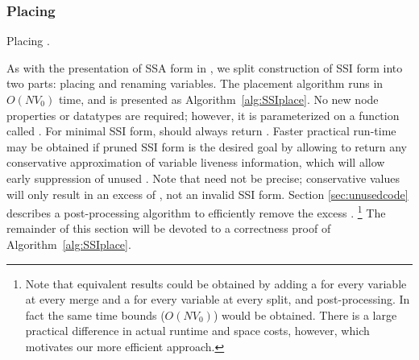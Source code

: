 \documentclass[12pt,titlepage,twoside]{article}
\begin{document}
\subsubsection{Placing }\label{sec:SSIplace}
\begin{myalgorithm}\small

\caption{Placing .}\label{alg:SSIplace}
\end{myalgorithm}

As with the presentation of SSA form in \cite{cytron91:ssa}, we split
construction of SSI form into two parts: placing 
and renaming variables.  The placement algorithm runs in $O(N V_0)$
time, and is presented as Algorithm~\vref{alg:SSIplace}.  No new node
properties or datatypes are required; however, it is parameterized on
a function called .  For minimal SSI form,
 should always return .  Faster practical
run-time may be obtained if pruned SSI form is the desired goal by
allowing  to return any conservative approximation of
variable liveness information, which will allow early suppression of
unused .  Note that  need not be
precise; conservative values will only result in an excess of
, not an invalid SSI form.  Section
\ref{sec:unusedcode} describes a post-processing algorithm to
efficiently remove the excess .%
\footnote{Note that equivalent results could be
obtained by adding a \phifunction{} for every variable at every merge
and a \sigfunction{} for every variable at every split, and
post-processing.  In fact the same time bounds ($O(N V_0)$) would be
obtained.  There is a large practical difference in actual runtime and
space costs, however, which motivates our more efficient approach.}
The remainder of this section will be devoted to a correctness proof
of Algorithm~\ref{alg:SSIplace}.
\end{document}
